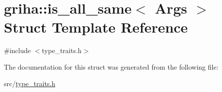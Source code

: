 \hypertarget{structgriha_1_1is__all__same}{}\section{griha\+:\+:is\+\_\+all\+\_\+same$<$ Args $>$ Struct Template Reference}
\label{structgriha_1_1is__all__same}


{\ttfamily \#include $<$type\+\_\+traits.\+h$>$}



The documentation for this struct was generated from the following file\+:\begin{DoxyCompactItemize}
\item 
src/\hyperlink{type__traits_8h}{type\+\_\+traits.\+h}\end{DoxyCompactItemize}

